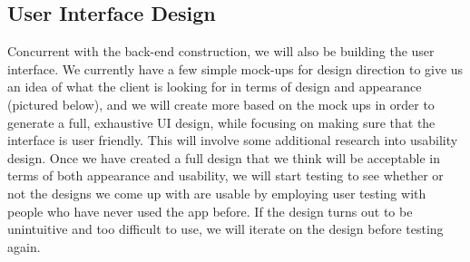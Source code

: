 \documentclass[draftclsnofoot, onecolumn,journal,letterpaper,10pt, compsoc]{IEEEtran}
\begin{document}
\subsection{User Interface Design}
Concurrent with the back-end construction, we will also be building the user interface. We currently have a few simple mock-ups for design direction to give us an idea of what the client is looking for in terms of design and appearance (pictured below), and we will create more based on the mock ups in order to generate a full, exhaustive UI design, while focusing on making sure that the interface is user friendly. This will involve some additional research into usability design. Once we have created a full design that we think will be acceptable in terms of both appearance and usability, we will start testing to see whether or not the designs we come up with are usable by employing user testing with people who have never used the app before. If the design turns out to be unintuitive and too difficult to use, we will iterate on the design before testing again.
\end{document}
